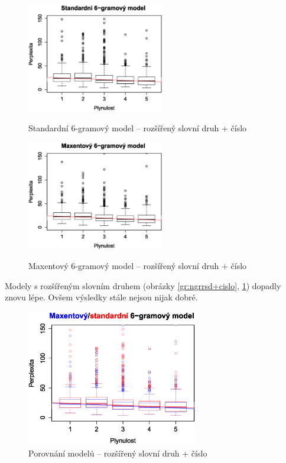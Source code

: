 \documentclass[12pt,a4paper]{report}
\begin{document}


\begin{figure}[!htb]
\begin{center}
  \centering\includegraphics[width=60mm]{./grafy/morf/ngram/rsd+cislo.svg.eps}
  \caption{Standardní 6-gramový model -- rozšířený slovní druh + číslo}\label{gr:ngrrsd+cislo}
\endminipage\quad
{}
  \centering\includegraphics[width=60mm]{./grafy/morf/maxent/rsd+cislo.svg.eps}
  \caption{Maxentový 6-gramový model -- rozšířený slovní druh + číslo}\label{gr:maxrsd+cislo}
\endminipage
\end{center}
\end{figure}




Modely s rozšířeným slovním druhem (obrázky \ref{gr:ngrrsd+cislo}, \ref{gr:maxrsd+cislo}) dopadly znovu lépe. Ovšem výsledky stále nejsou nijak dobré.

\begin{figure}[!htbp]
\begin{center}
	\centering
	\includegraphics[width=75mm]{./grafy/morf/porovnani/rsd+cislo.svg.eps}		
	\caption{Porovnání modelů -- rozšířený slovní druh + číslo}\label{gr:porrsd+cislo}
\endminipage
\end{center}
\end{figure}
\end{document}
